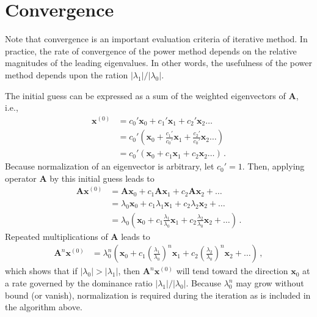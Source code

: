 \section{Convergence}
Note that convergence is an important evaluation criteria of iterative method. 
In practice, the rate of convergence of the power method depends on the relative magnitudes of the leading eigenvalues. 
In other words, the usefulness of the power method depends upon the ration $|\lambda_1|/|\lambda_0|$.

The initial guess can be expressed as a sum of the weighted eigenvectors of $\mathbf{A}$, i.e.,
\begin{equation}
\begin{split}
  \mathbf{x}^{(0)} 
     &=  c_0' \mathbf{x}_0 + c_1' \mathbf{x}_1 + c_2'  \mathbf{x}_2 \ldots \,  \\
     &=  c_0' \left (\mathbf{x}_0 + \frac{c_1'}{c_0'} \mathbf{x}_1 + \frac{c_2'}{c_0'} \mathbf{x}_2 \ldots  \right ) \\
     &=  c_0' \left (\mathbf{x}_0 + c_1 \mathbf{x}_1 + c_2 \mathbf{x}_2 \ldots  \right )\, .         
\end{split}
\end{equation}
Because normalization of an eigenvector is arbitrary, let $c_0' = 1$.
Then, applying operator $\mathbf{A}$ by this initial guess leads to 
\begin{equation}
\begin{split}
  \mathbf{A} \mathbf{x}^{(0)} 
   &=  \mathbf{A} \mathbf{x}_0  +  c_1 \mathbf{A} \mathbf{x}_1 + c_2 \mathbf{A} \mathbf{x}_2 + \ldots \\
   &= \lambda_0 \mathbf{x}_0 + c_1 \lambda_1 \mathbf{x}_1 + c_2 \lambda_2 \mathbf{x}_2 + \ldots \\ 
   &= \lambda_0 \left ( \mathbf{x}_0 + c_1 \frac{\lambda_1}{\lambda_0} \mathbf{x}_1 + c_2 \frac{\lambda_2}{\lambda_0} \mathbf{x}_2 + \ldots \right ) \, .
\end{split}
\end{equation}
Repeated multiplications of $\mathbf{A}$ leads to
\begin{equation}
\begin{split}
  \mathbf{A}^n \mathbf{x}^{(0)} 
   &= \lambda^n_0 \left ( \mathbf{x}_0 + c_1 \left( \frac{\lambda_1}{\lambda_0} \right)^n \mathbf{x}_1 + c_2 \left ( \frac{\lambda_2}{\lambda_0} \right )^n \mathbf{x}_2 + \ldots \right ) \, ,
\end{split}
\end{equation}
which shows that if $|\lambda_0| > |\lambda_1|$, then $\mathbf{A}^n \mathbf{x}^{(0)}$ will tend toward the direction $\mathbf{x}_0$ at a rate governed by the dominance ratio $|\lambda_1|/|\lambda_0|$. 
Because $\lambda^n_0$ may grow without bound (or vanish), normalization is required during the iteration as is included in the algorithm above.

